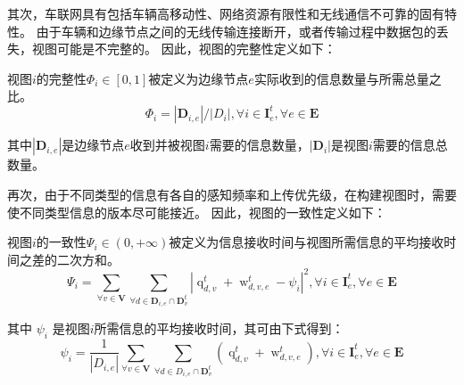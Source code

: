 其次，车联网具有包括车辆高移动性、网络资源有限性和无线通信不可靠的固有特性。
由于车辆和边缘节点之间的无线传输连接断开，或者传输过程中数据包的丢失，视图可能是不完整的。
因此，视图的完整性定义如下：
\begin{definition}
	视图$i$的完整性$\Phi_{i} \in [0,1]$被定义为边缘节点$e$实际收到的信息数量与所需总量之比。
	\begin{equation}
	\Phi_{i}= {| \mathbf{D}_{i, e} |} \big/ {|D_{i} |}, \forall i \in \mathbf{I}_e^t, \forall e \in \mathbf{E}
	\end{equation}
\end{definition}
\noindent 其中$|\mathbf{D}_{i, e}|$是边缘节点$e$收到并被视图$i$需要的信息数量，$|\mathbf{D}_{i}|$是视图$i$需要的信息总数量。

再次，由于不同类型的信息有各自的感知频率和上传优先级，在构建视图时，需要使不同类型信息的版本尽可能接近。
因此，视图的一致性定义如下： 
\begin{definition}
视图$i$的一致性$\Psi_{i} \in (0,+\infty)$被定义为信息接收时间与视图所需信息的平均接收时间之差的二次方和。
\begin{equation}
\Psi_{i}=\sum_{\forall v \in \mathbf{V}} \sum_{\forall d \in \mathbf{D}_{i, e} \cap \mathbf{D}_v^t} \left|\operatorname{q}_{d, v}^t + \operatorname{w}_{d, v, e}^t - \psi_{i} \right|^{2}, \forall i \in \mathbf{I}_e^t, \forall e \in \mathbf{E}
\end{equation}
\end{definition}
\noindent 其中 $\psi_{i}$ 是视图$i$所需信息的平均接收时间，其可由下式得到：
\begin{equation}
	\psi_{i} = \frac{1}{|D_{i, e}|} {\sum_{\forall v \in \mathbf{V}}\sum_{\forall d \in D_{i, e} \cap \mathbf{D}_v^t} \left( \operatorname{q}_{d, v}^t + \operatorname{w}_{d, v, e}^t\right) }, \forall i \in\mathbf{I}_e^t, \forall e \in \mathbf{E}
\end{equation}


